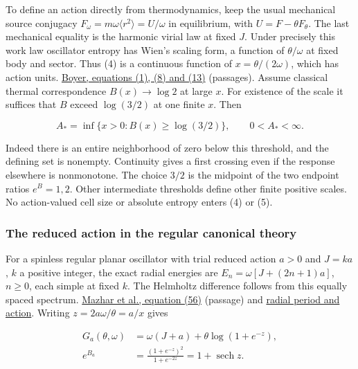 \documentclass[11pt,a4paper]{article}
\begin{document}
To define an action directly from thermodynamics, keep the usual
mechanical source conjugacy
\(F_\omega=m\omega\langle r^2\rangle=U/\omega\) in equilibrium, with
\(U=F-\theta F_\theta\). The last mechanical equality is the harmonic
virial law at fixed \(J\). Under precisely this work law oscillator
entropy has Wien's scaling form, a function of \(\theta/\omega\) at
fixed body and sector. Thus (4) is a continuous function of
\(x=\theta/(2\omega)\), which has action units.
\href{https://arxiv.org/pdf/physics/0210128}{Boyer, equations (1), (8)
and (13)} (passages). Assume classical thermal correspondence
\(B(x)\to\log 2\) at large \(x\). For existence of the scale it suffices
that \(B\) exceed \(\log(3/2)\) at one finite \(x\). Then

\[
 A_*=\inf\{x>0:B(x)\ge\log(3/2)\},\qquad 0<A_*<\infty .          \tag{5}
\]

Indeed there is an entire neighborhood of zero below this threshold, and
the defining set is nonempty. Continuity gives a first crossing even if
the response elsewhere is nonmonotone. The choice \(3/2\) is the
midpoint of the two endpoint ratios \(e^B=1,2\). Other intermediate
thresholds define other finite positive scales. No action-valued cell
size or absolute entropy enters (4) or (5).

\subsubsection{The reduced action in the regular canonical
theory}\label{the-reduced-action-in-the-regular-canonical-theory}

For a spinless regular planar oscillator with trial reduced action
\(a>0\) and \(J=ka\), \(k\) a positive integer, the exact radial
energies are \(E_n=\omega[J+(2n+1)a]\), \(n\ge0\), each simple at fixed
\(k\). The Helmholtz difference follows from this equally spaced
spectrum. \href{https://doi.org/10.3390/sym16030297}{Mazhar et al.,
equation (56)} (passage) and
\href{rivero-1998-conjecture-central-forces.md\#5-hooke-and-kepler-radial-actions-and-maslov-phases}{radial
period and action}. Writing \(z=2a\omega/\theta=a/x\) gives

\[
 \begin{aligned}
 G_a(\theta,\omega)&=\omega(J+a)+\theta\log(1+e^{-z}),\\
 e^{B_a}&=\frac{(1+e^{-z})^2}{1+e^{-2z}}=1+\operatorname{sech}z .
 \end{aligned}                                                       \tag{6}
\]
\end{document}
